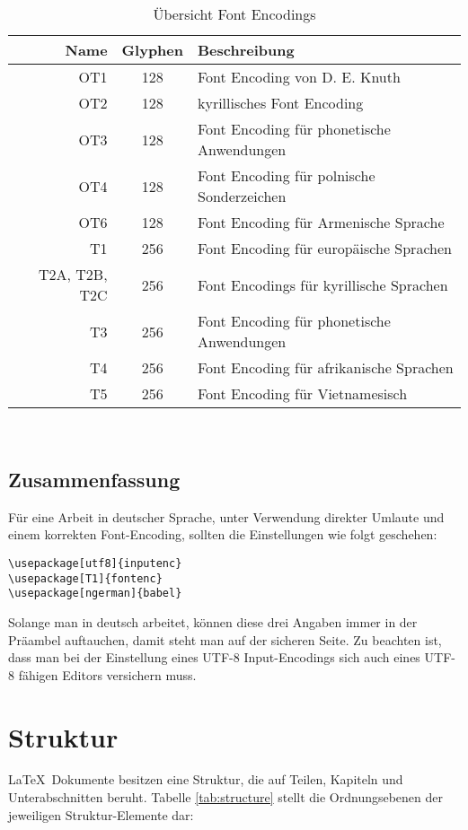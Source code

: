 \begin{table}[h]
\centering
\begin{tabular}{r|c|l}
\hline
\textbf{Name} & \textbf{Glyphen} & \textbf{Beschreibung} \\
\hline
OT1 & 128 & Font Encoding von D. E. Knuth \\
OT2 & 128 & kyrillisches Font Encoding \\
OT3 & 128 & Font Encoding für phonetische Anwendungen \\
OT4 & 128 & Font Encoding für polnische Sonderzeichen \\
OT6 & 128 & Font Encoding für Armenische Sprache \\
T1 & 256 & Font Encoding für europäische Sprachen \\
T2A, T2B, T2C & 256 & Font Encodings für kyrillische Sprachen \\
T3 & 256 & Font Encoding für phonetische Anwendungen \\
T4 & 256 & Font Encoding für afrikanische Sprachen \\
T5 & 256 & Font Encoding für Vietnamesisch \\
\hline
\end{tabular}\\[3mm]
\caption{Übersicht Font Encodings} \label{tab:encodings}
\end{table}


\subsection{Zusammenfassung}

Für eine Arbeit in deutscher Sprache, unter Verwendung direkter Umlaute und einem korrekten Font-Encoding, sollten die Einstellungen wie folgt geschehen:
\begin{verbatim}
\usepackage[utf8]{inputenc}
\usepackage[T1]{fontenc}
\usepackage[ngerman]{babel}
\end{verbatim}

Solange man in deutsch arbeitet, können diese drei Angaben immer in der Präambel auftauchen, damit steht man auf der sicheren Seite. Zu beachten ist, dass man bei der Einstellung eines UTF-8 Input-Encodings sich auch eines UTF-8 fähigen Editors versichern muss. 

\section{Struktur}

\LaTeX\ Dokumente besitzen eine Struktur, die auf Teilen, Kapiteln und Unterabschnitten beruht. Tabelle \ref{tab:structure} stellt die Ordnungsebenen der jeweiligen Struktur-Elemente dar:

